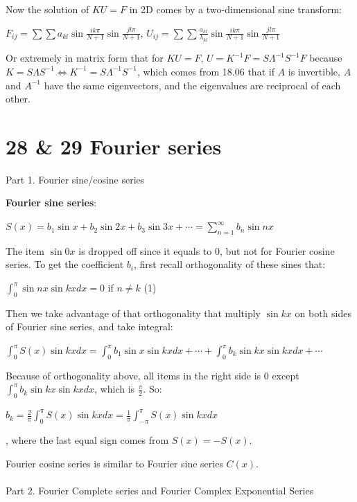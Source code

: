 \documentclass{article}
\newenvironment{nscenter}
{\parskip=0pt\par\nopagebreak\centering}
{\par\noindent\ignorespacesafterend}
\begin{document}
\begin{spacing}{1.5}
Now the solution of $KU = F$ in 2D comes by a two-dimensional sine transform:
\begin{nscenter}
	$F_{ij}=\sum\sum a_{kl} \sin \frac{ik\pi}{N+1} \sin \frac{jl\pi}{N+1}$, $U_{ij}=\sum\sum \frac{a_{kl}}{\lambda_{kl}} \sin \frac{ik\pi}{N+1} \sin \frac{jl\pi}{N+1}$
\end{nscenter}

Or extremely in matrix form that for $KU=F$, $U=K^{-1}F=S\Lambda^{-1}S^{-1}F$ because $K=S\Lambda S^{-1} \Leftrightarrow K^{-1} = S\Lambda^{-1}S^{-1}$, which comes from 18.06 that if $A$ is invertible, $A$ and $A^{-1}$ have the same eigenvectors, and the eigenvalues are reciprocal of each other.


\section*{28 \& 29 Fourier series}
Part 1. Fourier sine/cosine series

{\bfseries Fourier sine series}: 
\begin{nscenter}
	$S(x)=b_1\sin x + b_2\sin 2x + b_3 \sin3x + \cdots=\sum_{n=1}^{\infty}b_n \sin nx$
\end{nscenter}
The item $\sin 0x$ is dropped off since it equals to 0, but not for Fourier cosine series. To get the coefficient $b_i$,  first recall orthogonality of these sines that:
\begin{nscenter}
	$\int_0^{\pi} \sin nx \sin kx dx = 0$ if $n\neq k$ \qquad (1)
\end{nscenter}
Then we take advantage of that orthogonality that multiply $\sin kx$ on both sides of Fourier sine series, and take integral:
\begin{nscenter}
	$\int_0^{\pi} S(x) \sin kx dx = \int_0^{\pi} b_1 \sin x \sin kx dx + \cdots + \int_0^{\pi} b_k \sin kx \sin kx dx + \cdots$
\end{nscenter}
Because of orthogonality above, all items in the right side is 0 except \\$\int_0^{\pi} b_k \sin kx \sin kx dx$, which is $\frac{\pi}{2}$. So:
\begin{nscenter}
	$b_k = \frac{2}{\pi} \int_0^{\pi} S(x) \sin kx dx = \frac{1}{\pi} \int_{-\pi}^{\pi} S(x) \sin kx dx$
\end{nscenter}
, where the last equal sign comes from $S(x)=-S(x)$.

Fourier cosine series is similar to Fourier sine series $C(x)$.
\\\\Part 2. Fourier Complete series and Fourier Complex Exponential Series


\end{spacing}
\end{document}
